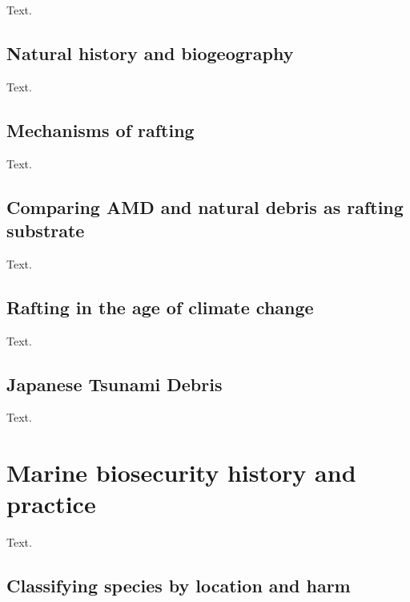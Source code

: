\documentclass[a4paper, nobind]{templates/ociamthesis}
\begin{document}
Text.

\hypertarget{natural-history-and-biogeography}{%
\subsection{Natural history and biogeography}\label{natural-history-and-biogeography}}

Text.

\hypertarget{mechanisms-of-rafting}{%
\subsection{Mechanisms of rafting}\label{mechanisms-of-rafting}}

Text.

\hypertarget{comparing-amd-and-natural-debris-as-rafting-substrate}{%
\subsection{Comparing AMD and natural debris as rafting substrate}\label{comparing-amd-and-natural-debris-as-rafting-substrate}}

Text.

\hypertarget{rafting-in-the-age-of-climate-change}{%
\subsection{Rafting in the age of climate change}\label{rafting-in-the-age-of-climate-change}}

Text.

\hypertarget{japanese-tsunami-debris}{%
\subsection{Japanese Tsunami Debris}\label{japanese-tsunami-debris}}

Text.

\hypertarget{marine-biosecurity-history-and-practice}{%
\section{Marine biosecurity history and practice}\label{marine-biosecurity-history-and-practice}}

Text.

\hypertarget{classifying-species-by-location-and-harm}{%
\subsection{Classifying species by location and harm}\label{classifying-species-by-location-and-harm}}
\end{document}
